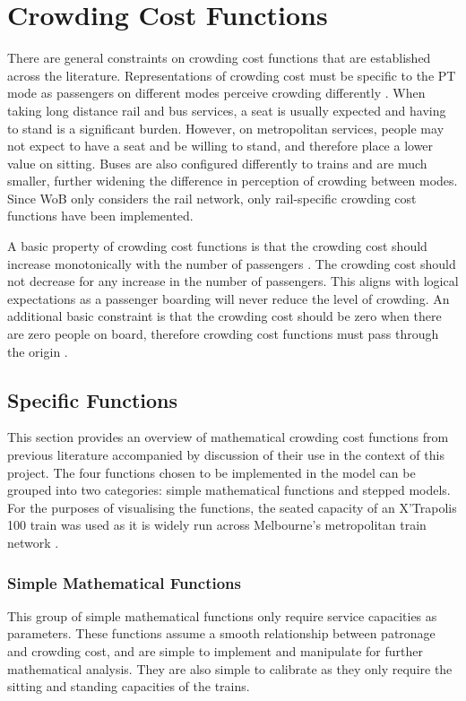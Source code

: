 \section{Crowding Cost Functions}
\label{sec:crowding_cost_functions}
There are general constraints on crowding cost functions that are established across the literature. Representations of crowding cost must be specific to the PT mode as passengers on different modes perceive crowding differently \cite{qinInvestigatingInVehicleCrowding2014}. When taking long distance rail and bus services, a seat is usually expected and having to stand is a significant burden. However, on metropolitan services, people may not expect to have a seat and be willing to stand, and therefore place a lower value on sitting. Buses are also configured differently to trains and are much smaller, further widening the difference in perception of crowding between modes. Since WoB only considers the rail network, only rail-specific crowding cost functions have been implemented. 

A basic property of crowding cost functions is that the crowding cost should increase monotonically with the number of passengers \cite{tianEquilibriumPropertiesMorning2007, qinInvestigatingInVehicleCrowding2014}. The crowding cost should not decrease for any increase in the number of passengers. This aligns with logical expectations as a passenger boarding will never reduce the level of crowding. An additional basic constraint is that the crowding cost should be zero when there are zero people on board, therefore crowding cost functions must pass through the origin \cite{tianEquilibriumPropertiesMorning2007}.  

\subsection{Specific Functions}
\label{subsec:crowding_functions}
This section provides an overview of mathematical crowding cost functions from previous literature accompanied by discussion of their use in the context of this project. The four functions chosen to be implemented in the model can be grouped into two categories: simple mathematical functions and stepped models. For the purposes of visualising the functions, the seated capacity of an X'Trapolis 100 train was used as it is widely run across Melbourne's metropolitan train network \cite{metrotrainsmelbourneWTTNetworkConfiguration2023}. 

\subsubsection{Simple Mathematical Functions}
\label{subsubsec:crowding_simplemath}
This group of simple mathematical functions only require service capacities as parameters. These functions assume a smooth relationship between patronage and crowding cost, and are simple to implement and manipulate for further mathematical analysis. They are also simple to calibrate as they only require the sitting and standing capacities of the trains. 

